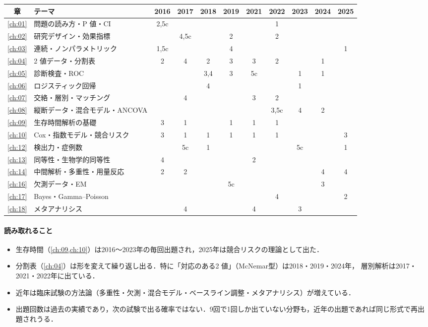 \documentclass[a4paper,11pt,openany]{ltjsbook}
\begin{document}
\begin{center}\small
\setlength{\tabcolsep}{3.2pt}
\begin{tabular}{@{}clccccccccc@{}}
\toprule
章 & テーマ & 2016 & 2017 & 2018 & 2019 & 2021 & 2022 & 2023 & 2024 & 2025\\
\midrule
\ref{ch:01} & 問題の読み方・P 値・CI & 2,5c & & & & & 1 & & & \\
\ref{ch:02} & 研究デザイン・効果指標 & & 4,5c & & 2 & & 2 & & & \\
\ref{ch:03} & 連続・ノンパラメトリック & 1,5c & & & 4 & & & & & 1\\
\ref{ch:04} & 2 値データ・分割表 & 2 & 4 & 2 & 3 & 3 & 2 & & 1 & \\
\ref{ch:05} & 診断検査・ROC & & & 3,4 & 3 & 5c & & 1 & 1 & \\
\ref{ch:06} & ロジスティック回帰 & & & 4 & & & & 1 & & \\
\ref{ch:07} & 交絡・層別・マッチング & & 4 & & & 3 & 2 & & & \\
\ref{ch:08} & 縦断データ・混合モデル・ANCOVA & & & & & & 3,5c & 4 & 2 & \\
\ref{ch:09} & 生存時間解析の基礎 & 3 & 1 & & 1 & 1 & 1 & & & \\
\ref{ch:10} & Cox・指数モデル・競合リスク & 3 & 1 & 1 & 1 & 1 & 1 & & & 3\\
\ref{ch:12} & 検出力・症例数 & & 5c & 1 & & & & 5c & & 1\\
\ref{ch:13} & 同等性・生物学的同等性 & 4 & & & & 2 & & & & \\
\ref{ch:14} & 中間解析・多重性・用量反応 & 2 & 2 & & & & & & 4 & 4\\
\ref{ch:16} & 欠測データ・EM & & & & 5c & & & & 3 & \\
\ref{ch:17} & Bayes・Gamma--Poisson & & & & & & 4 & & & 2\\
\ref{ch:18} & メタアナリシス & & 4 & & & 4 & & 3 & & \\
\bottomrule
\end{tabular}
\end{center}

\paragraph{読み取れること}
\begin{itemize}
\item 生存時間（\cref{ch:09,ch:10}）は2016〜2023年の毎回出題され，2025年は競合リスクの理論として出た．
\item 分割表（\cref{ch:04}）は形を変えて繰り返し出る．特に「対応のある2 値」（McNemar型）は2018・2019・2024年，
      層別解析は2017・2021・2022年に出ている．
\item 近年は臨床試験の方法論（多重性・欠測・混合モデル・ベースライン調整・メタアナリシス）が増えている．
\item 出題回数は過去の実績であり，次の試験で出る確率ではない．9回で1回しか出ていない分野も，近年の出題であれば同じ形式で再出題されうる．
\end{itemize}
\end{document}
